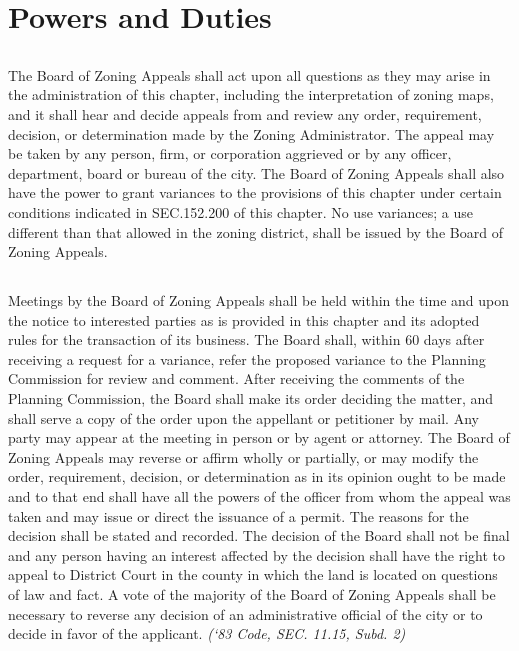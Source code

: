 \section{Powers and Duties}
\subsection{}
The Board of Zoning Appeals shall act upon all questions as they may arise in the administration of this chapter, including the interpretation of zoning maps, and it shall hear and decide appeals from and review any order, requirement, decision, or determination made by the Zoning Administrator. The appeal may be taken by any person, firm, or corporation aggrieved or by any officer, department, board or bureau of the city. The Board of Zoning Appeals shall also have the power to grant variances to the provisions of this chapter under certain conditions indicated in SEC.152.200 of this chapter. No use variances; a use different than that allowed in the zoning district, shall be issued by the Board of Zoning Appeals.
\subsection{}
Meetings by the Board of Zoning Appeals shall be held within the time and upon the notice to interested parties as is provided in this chapter and its adopted rules for the transaction of its business. The Board shall, within 60 days after receiving a request for a variance, refer the proposed variance to the Planning Commission for review and comment. After receiving the comments of the Planning Commission, the Board shall make its order deciding the matter, and shall serve a copy of the order upon the appellant or petitioner by mail. Any party may appear at the meeting in person or by agent or attorney. The Board of Zoning Appeals may reverse or affirm wholly or partially, or may modify the order, requirement, decision, or determination as in its opinion ought to be made and to that end shall have all the powers of the officer from whom the appeal was taken and may issue or direct the issuance of a permit. The reasons for the decision shall be stated and recorded.  The decision of the Board shall not be final and any person having an interest affected by the decision shall have the right to appeal to District Court in the county in which the land is located on questions of law and fact. A vote of the majority of the Board of Zoning Appeals shall be necessary to reverse any decision of an administrative official of the city or to decide in favor of the applicant.\newline
\emph{(‘83 Code, SEC. 11.15, Subd. 2)}\newline

